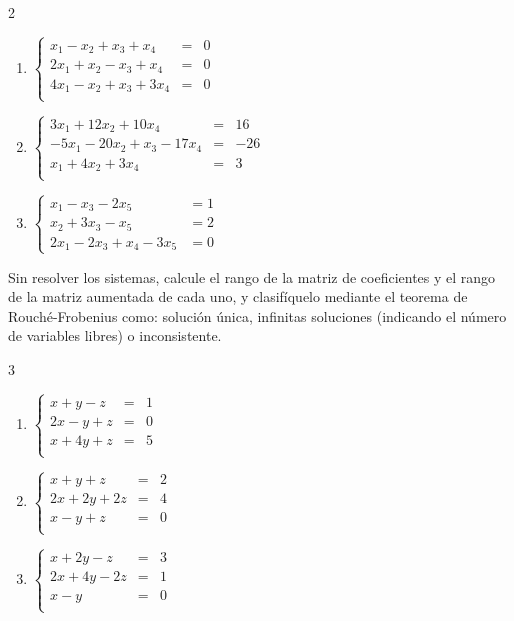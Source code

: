 \begin{prob}
\begin{multicols}{2}
\begin{enumerate}[$a)$]
	\item $\left\lbrace \begin{array}{ccc}
	x_1-x_2+x_3+x_4&=&0\\
	2x_1+x_2-x_3+x_4&=&0\\
	4x_1-x_2+x_3+3x_4&=&0\\
	\end{array} \right. $
	
		\item $\left\lbrace \begin{array}{ccc}
	3x_1+12x_2+10x_4&=&16\\
	-5x_1-20x_2+x_3-17x_4&=&-26\\
	x_1+4x_2+3x_4&=&3\\
	\end{array} \right. $

	
	\item $\left\lbrace \begin{array}{cc}
x_1 -x_3 -2x_5&=1 \\ 
   x_2+3x_3-x_5 &=2 \\ 
   2x_1 -2x_3 +x_4 -3x_5 &= 0 
\end{array} \right.$
\end{enumerate}
\end{multicols}
\end{prob}

\begin{prob} Sin resolver los sistemas, calcule el rango de la matriz de coeficientes y el rango de la matriz aumentada de cada uno, y clasifíquelo mediante el teorema de Rouché-Frobenius como: solución única, infinitas soluciones (indicando el número de variables libres) o inconsistente.
\begin{multicols}{3}
\begin{enumerate}[$a)$]
\item $\left\lbrace \begin{array}{ccc}
x+y-z&=&1\\
2x-y+z&=&0\\
x+4y+z&=&5\\
\end{array} \right. $

\item $\left\lbrace \begin{array}{ccc}
x+y+z&=&2\\
2x+2y+2z&=&4\\
x-y+z&=&0\\
\end{array} \right. $

\item $\left\lbrace \begin{array}{ccc}
x+2y-z&=&3\\
2x+4y-2z&=&1\\
x-y&=&0\\
\end{array} \right. $
\end{enumerate}
\end{multicols}
\end{prob}

